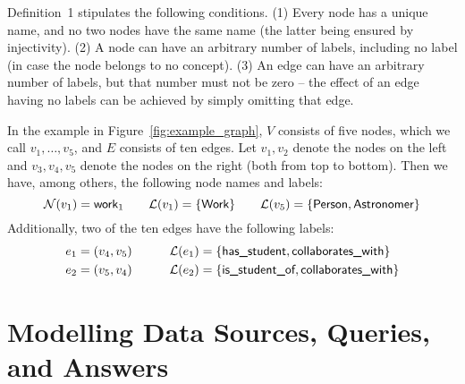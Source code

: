 %
Definition~1 stipulates the following conditions.
%
(1) Every node has a unique name, and no two nodes have the same name (the latter being ensured by injectivity).
(2) A node can have an arbitrary number of labels, including no label (in case the node belongs to no concept).
(3) An edge can have an arbitrary number of labels, but that number must not be zero --
the effect of an edge having no labels can be achieved by simply omitting that edge.

In the example in Figure~\ref{fig:example_graph},
$V$ consists of five nodes, which we call $v_1,\dots,v_5$,
and $E$ consists of ten edges. Let $v_1,v_2$ denote the nodes on the left and $v_3,v_4,v_5$
denote the nodes on the right (both from top to bottom).
Then we have, among others, the following node names and labels:
%
\begin{equation*}
  \mathcal{N}(v_1) = \textsf{work}_1
  \qquad
  \mathcal{L}(v_1) = \{\textsf{Work}\}
  \qquad
  \mathcal{L}(v_5) = \{\textsf{Person},\textsf{Astronomer}\}
\end{equation*}
%
Additionally, two of the ten edges have the following labels:
%
\begin{alignat*}{2}
  e_1 & = (v_4,v_5) & \qquad \mathcal{L}(e_1) & = \{\textsf{has\_student},\textsf{collaborates\_with}\} \\
  e_2 & = (v_5,v_4) &        \mathcal{L}(e_2) & = \{\textsf{is\_student\_of},\textsf{collaborates\_with}\} \\
\end{alignat*}

\section{Modelling Data Sources, Queries, and Answers}
\label{sec:modelling}

